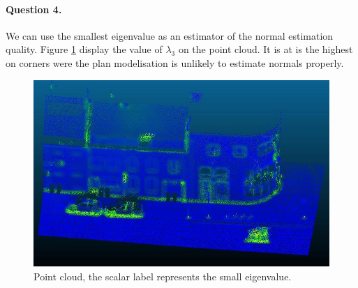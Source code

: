 \documentclass[french]{article}
\begin{document}
\paragraph{Question 4.} We can use the smallest eigenvalue as an estimator of the normal estimation quality. Figure \ref{fig:q4} display the value of $\lambda_3$ on the point cloud. It is at is the highest on corners were the plan modelisation  is unlikely to estimate normals properly.

\begin{figure}[h]
	\centering
	\includegraphics[width=0.6\linewidth]{q4.jpg}
	\caption{Point cloud, the scalar label represents the small eigenvalue.}
	\label{fig:q4}
\end{figure}
\end{document}
